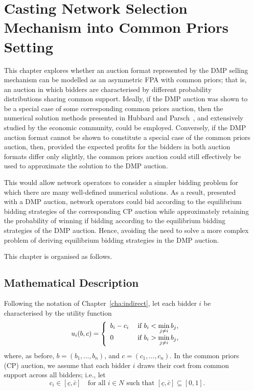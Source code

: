 \chapter{Casting Network Selection Mechanism into Common Priors Setting}
\label{cha:approximation}

\minitoc
\vspace{10mm}

This chapter explores whether an auction format represented by the DMP selling mechanism can be modelled as an asymmetric FPA with common priors; that is, an auction in which bidders are characterised by different probability distributions sharing common support. Ideally, if the DMP auction was shown to be a special case of some corresponding common priors auction, then the numerical solution methods presented in Hubbard and Parsch~\cite{HubbardPaarsch2011}, and extensively studied by the economic community, could be employed. Conversely, if the DMP auction format cannot be shown to constitute a special case of the common priors auction, then, provided the expected profits for the bidders in both auction formats differ only slightly, the common priors auction could still effectively be used to approximate the solution to the DMP auction.

This would allow network operators to consider a simpler bidding problem for which there are many well-defined numerical solutions. As a result, presented with a DMP auction, network operators could bid according to the equilibrium bidding strategies of the corresponding CP auction while approximately retaining the probability of winning if bidding according to the equilibrium bidding strategies of the DMP auction. Hence, avoiding the need to solve a more complex problem of deriving equilibrium bidding strategies in the DMP auction.

This chapter is organised as follows. 

\section{Mathematical Description} %
\label{sec:mathematical_description_approximation}

Following the notation of Chapter~\ref{cha:indirect}, let each bidder $i$ be characterised by the utility function
\begin{equation}
  \label{eq:utility_approximation}
    u_i(b,c) = \left\{
  \begin{array}{l l}
    b_i-c_i & \;\text{if } b_i < \displaystyle\min_{j\neq i}b_j,\\
    0 & \;\text{if } b_i > \displaystyle\min_{j\neq i}b_j,
  \end{array}\right.
\end{equation}
where, as before, $b = (b_1,\ldots,b_n)$, and $c = (c_1,\ldots,c_n)$. In the common priors (CP) auction, we assume that each bidder $i$ draws their cost from common support across all bidders; i.e., let
\begin{equation*}
  c_i\in [\underline{c}, \bar{c}] \quad\text{for all } i\in N \text{ such that } [\underline{c}, \bar{c}]\subseteq [0, 1].
\end{equation*}

